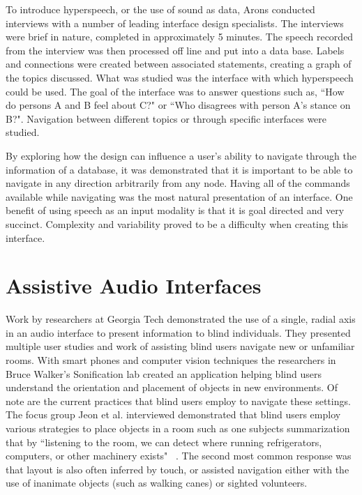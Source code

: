 To introduce hyperspeech, or the use of sound as data, Arons conducted interviews
with a number of leading interface design specialists.  The interviews were
brief in nature, completed in approximately 5 minutes.  The speech recorded
from the interview was then processed off line and put into a data base.
Labels and connections were created between associated statements, creating a
graph of the topics discussed.  What was studied was the interface with which
hyperspeech could be used.  The goal of the interface was to answer questions
such as, ``How do persons A and B feel about C?" or ``Who disagrees with person
A's stance on B?".  Navigation between different topics or through specific
interfaces were studied.

By exploring how the design can influence a user's ability to navigate through
the information of a database, it was demonstrated that it is important to
be able to navigate in any direction arbitrarily from any node. Having all of
the commands available while navigating was the most natural presentation of
an interface.  One benefit of using speech as an input modality is that it is
goal directed and very succinct.  Complexity and variability proved to be a
difficulty when creating this interface.

\section{                 Assistive Audio Interfaces                           }

Work by researchers at Georgia Tech demonstrated the use of a single, radial axis
in an audio interface to present information to blind individuals. They presented
multiple user studies and work of assisting blind users navigate new or unfamiliar
rooms.  With smart phones and computer vision techniques the researchers in
Bruce Walker's Sonification lab created an application helping blind users understand
the orientation and placement of objects in new environments. Of note are the
current practices that blind users employ to navigate these settings. The focus group
Jeon et al. interviewed demonstrated that blind users employ
various strategies to place objects in a room such as one subjects summarization
that by ``listening to the room, we can detect where running refrigerators,
computers, or other machinery exists" ~\cite{jeon2012listen2droom}. The second
most common response was that layout is also often inferred by touch, or assisted
navigation either with the use of inanimate objects (such as walking canes)
or sighted volunteers.

